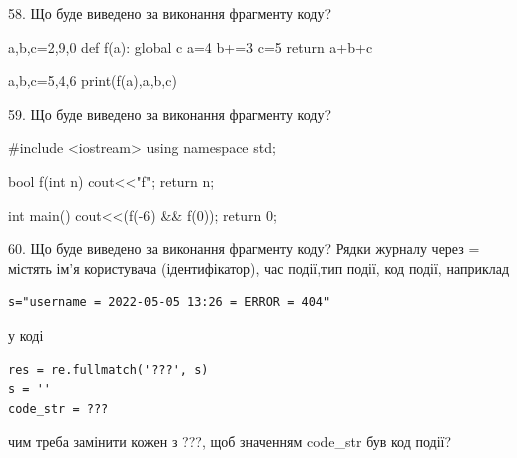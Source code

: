 \documentclass[11pt]{article}
\begin{document}
58. Що буде виведено за виконання фрагменту коду?

a,b,c=2,9,0
def f(a):
global c    a=4
    b+=3
    c=5
    return a+b+c

a,b,c=5,4,6
print(f(a),a,b,c)

59. Що буде виведено за виконання фрагменту коду?

#include <iostream>
using namespace std;

bool f(int n){
    cout<<"f";
    return n;
}

int main(){
    cout<<(f(-6) && f(0));
    return 0;
}

60. Що буде виведено за виконання фрагменту коду?
Рядки журналу через = містять ім'я користувача (ідентифікатор), час події,тип події, код події, наприклад
\begin{verbatim}
s="username = 2022-05-05 13:26 = ERROR = 404"
\end{verbatim}
у коді 
\begin{verbatim}
res = re.fullmatch('???', s) 
s = ''
code_str = ??? 
\end{verbatim}
чим треба замінити кожен з ???, щоб значенням code\_str був код події? 































































\newpage
\end{document}
